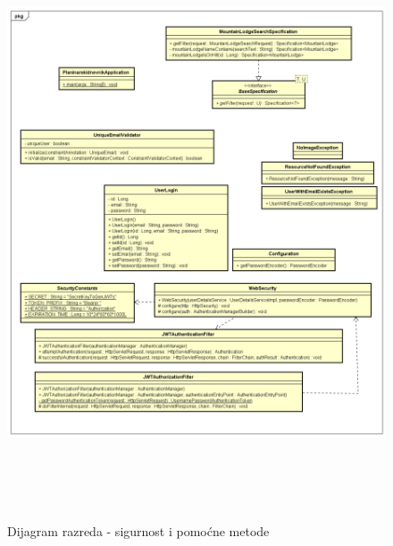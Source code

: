 		
			\begin{figure}[H]
				\includegraphics[scale=0.6, height=175mm, width=165mm]{dijagrami/helpers-class.png} %
				\centering
				\caption{Dijagram razreda - sigurnost i pomoćne metode}
				\label{fig:dijagrami_razreda5}
			\end{figure}
			
			\eject
			
			
			
			
			\eject
		
			
			
			
